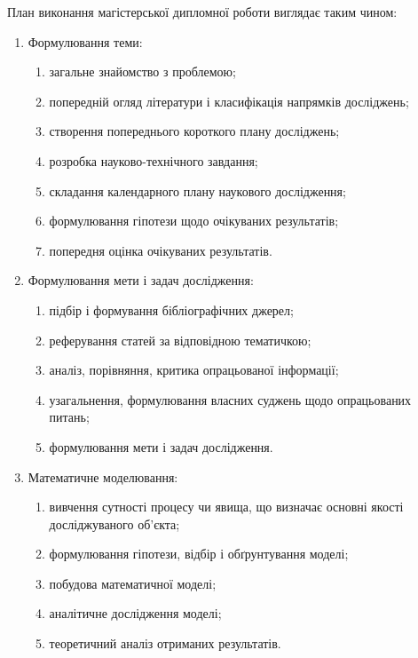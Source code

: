 \documentclass{mathreport}
\begin{document}
План виконання магістерської дипломної роботи виглядає таким чином:
\begin{enumerate}[label=\arabic*.]
    \item Формулювання теми:
    \begin{enumerate}[label=\arabic{enumi}.\arabic{enumii}]
        \item загальне знайомство з проблемою;
        \item попередній огляд літератури і класифікація напрямків досліджень;
        \item створення попереднього короткого плану досліджень;
        \item розробка науково-технічного завдання;
        \item складання календарного плану наукового дослідження;
        \item формулювання гіпотези щодо очікуваних результатів;
        \item попередня оцінка очікуваних результатів.
    \end{enumerate}
    \item Формулювання мети і задач дослідження:
    \begin{enumerate}[label=\arabic{enumi}.\arabic{enumii}]
        \item підбір і формування бібліографічних джерел;
        \item реферування статей за відповідною тематичкою;
        \item аналіз, порівняння, критика опрацьованої інформації;
        \item узагальнення, формулювання власних суджень щодо опрацьованих питань;
        \item формулювання мети і задач дослідження.
    \end{enumerate}
    \item Математичне моделювання:
    \begin{enumerate}[label=\arabic{enumi}.\arabic{enumii}]
        \item вивчення сутності процесу чи явища, що визначає основні якості досліджуваного об'єкта;
        \item формулювання гіпотези, відбір і обґрунтування моделі;
        \item побудова математичної моделі;
        \item аналітичне дослідження моделі;
        \item теоретичний аналіз отриманих результатів.
    \end{enumerate}

\end{enumerate}
\end{document}
